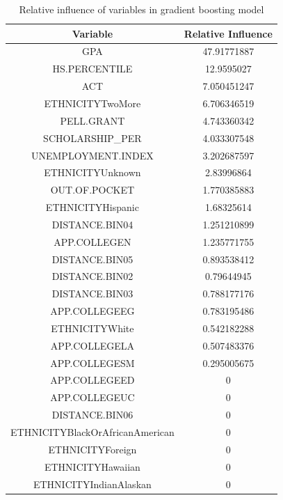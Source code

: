 \documentclass[12pt,english]{report}
\begin{document}
\begin{table}[h!]
\centering
\caption{Relative influence of variables in gradient boosting model}
\label{relatice_influ}
\begin{tabular}{|c|c|}
\hline
Variable                        & Relative Influence \\ \hline
GPA                             & 47.91771887        \\ \hline
HS.PERCENTILE                   & 12.9595027         \\ \hline
ACT                             & 7.050451247        \\ \hline
ETHNICITYTwoMore                & 6.706346519        \\ \hline
PELL.GRANT                      & 4.743360342        \\ \hline
SCHOLARSHIP\_PER                & 4.033307548        \\ \hline
UNEMPLOYMENT.INDEX              & 3.202687597        \\ \hline
ETHNICITYUnknown                & 2.83996864         \\ \hline
OUT.OF.POCKET                   & 1.770385883        \\ \hline
ETHNICITYHispanic               & 1.68325614         \\ \hline
DISTANCE.BIN04                  & 1.251210899        \\ \hline
APP.COLLEGEN                    & 1.235771755        \\ \hline
DISTANCE.BIN05                  & 0.893538412        \\ \hline
DISTANCE.BIN02                  & 0.79644945         \\ \hline
DISTANCE.BIN03                  & 0.788177176        \\ \hline
APP.COLLEGEEG                   & 0.783195486        \\ \hline
ETHNICITYWhite                  & 0.542182288        \\ \hline
APP.COLLEGELA                   & 0.507483376        \\ \hline
APP.COLLEGESM                   & 0.295005675        \\ \hline
APP.COLLEGEED                   & 0                  \\ \hline
APP.COLLEGEUC                   & 0                  \\ \hline
DISTANCE.BIN06                  & 0                  \\ \hline
ETHNICITYBlackOrAfricanAmerican & 0                  \\ \hline
ETHNICITYForeign                & 0                  \\ \hline
ETHNICITYHawaiian               & 0                  \\ \hline
ETHNICITYIndianAlaskan          & 0                  \\ \hline
\end{tabular}
\end{table}
\end{document}
